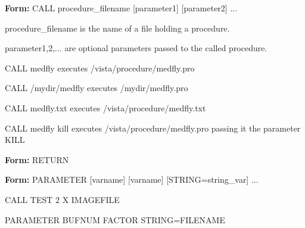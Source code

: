 {\newpage\clearpage
{}%
\begin{command}
  \item[\textbf{Form: } CALL procedure\_filename {[parameter1]} {[parameter2]} ...\hfill]{}
  \item[procedure\_filename]{is the name of a file holding a procedure.}
  \item[parameter1,2,...]{are optional parameters passed to the called procedure.}
\end{command}%
\lthtmlfigureZ
\lthtmlcheckvsize\clearpage}

{\newpage\clearpage
{}%
\begin{example}
  \item[CALL medfly\hfill]{executes /vista/procedure/medfly.pro}
  \item[CALL /mydir/medfly\hfill]{executes /mydir/medfly.pro}
  \item[CALL medfly.txt\hfill]{executes /vista/procedure/medfly.txt}
  \item[CALL medfly kill\hfill]{executes /vista/procedure/medfly.pro
passing it the parameter KILL}
\end{example}%
\lthtmlfigureZ
\lthtmlcheckvsize\clearpage}

{\newpage\clearpage
{}%
\begin{command}
  \item[\textbf{Form: } RETURN\hfill]{}
\end{command}%
\lthtmlfigureZ
\lthtmlcheckvsize\clearpage}

{\newpage\clearpage
{}%
\begin{command}
  \item[\textbf{Form: } PARAMETER {[varname]} {[varname]} {[STRING=string\_var]} ...\hfill]{}
\end{command}%
\lthtmlfigureZ
\lthtmlcheckvsize\clearpage}

{\newpage\clearpage
{}%
\begin{hanging}
  \item{CALL TEST 2 X IMAGEFILE}
\end{hanging}%
\lthtmlfigureZ
\lthtmlcheckvsize\clearpage}

{\newpage\clearpage
{}%
\begin{hanging}
  \item{PARAMETER BUFNUM FACTOR STRING=FILENAME}
\end{hanging}%
\lthtmlfigureZ
\lthtmlcheckvsize\clearpage}

